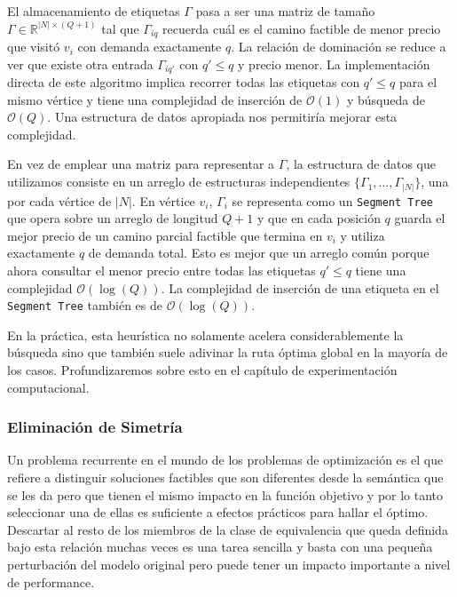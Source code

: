 El almacenamiento de etiquetas $\Gamma$ pasa a ser una matriz de tamaño $\Gamma \in \mathbb{R}^{|N| \times (Q+1)}$ tal que $\Gamma_{iq}$ recuerda cuál es el camino factible de menor precio que visitó $v_i$ con demanda exactamente $q$. La relación de dominación se reduce a ver que existe otra entrada $\Gamma_{iq'}$ con $q' \leq q$ y precio menor. La implementación directa de este algoritmo implica recorrer todas las etiquetas con $q' \leq q$ para el mismo vértice y tiene una complejidad de inserción de $\mathcal{O}(1)$ y búsqueda de $\mathcal{O}(Q)$. Una estructura de datos apropiada nos permitiría mejorar esta complejidad.

En vez de emplear una matriz para representar a $\Gamma$, la estructura de datos que utilizamos consiste en un arreglo de estructuras independientes $\{\Gamma_1, \dots, \Gamma_{|N|}\}$, una por cada vértice de $|N|$. En vértice $v_i$, $\Gamma_i$ se representa como un \texttt{Segment Tree} que opera sobre un arreglo de longitud $Q + 1$ y que en cada posición $q$ guarda el mejor precio de un camino parcial factible que termina en $v_i$ y utiliza exactamente $q$ de demanda total. Esto es mejor que un arreglo común porque ahora consultar el menor precio entre todas las etiquetas $q' \leq q$ tiene una complejidad $\mathcal{O}(\log(Q))$. La complejidad de inserción de una etiqueta en el \texttt{Segment Tree} también es de $\mathcal{O}(\log(Q))$.

En la práctica, esta heurística no solamente acelera considerablemente la bús\-queda sino que también suele adivinar la ruta óptima global en la mayoría de los casos. Profundizaremos sobre esto en el capítulo de experimentación computacional.


\subsubsection{Eliminación de Simetría}

Un problema recurrente en el mundo de los problemas de optimización es el que refiere a distinguir soluciones factibles que son diferentes desde la semántica que se les da pero que tienen el mismo impacto en la función objetivo y por lo tanto seleccionar una de ellas es suficiente a efectos prácticos para hallar el óptimo. Descartar al resto de los miembros de la clase de equivalencia que queda definida bajo esta relación muchas veces es una tarea sencilla y basta con una pequeña perturbación del modelo original pero puede tener un impacto importante a nivel de performance. 

